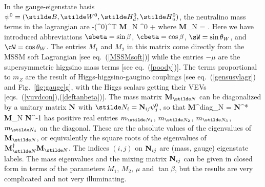In the gauge-eigenstate basis
$\psi^0 = (\stilde B, \stilde W^0, \stilde H_d^0, \stilde H_u^0)$,
the neutralino mass terms in the lagrangian are
\beq
\lagr \supset -\half (\psi^{0})^T {\bf M}_{\stilde N} \psi^0 + \conj
\eeq
where
\beq
{\bf M}_{\stilde N} = .
\label{neutralinomassmatrix}
\eeq
Here we have introduced abbreviations $\sbeta = \sin\beta$,
$\cbeta = \cos\beta$, $\sW = \sin\theta_W$, and $\cW = \cos\theta_W$.
The entries $M_1$ and $M_2$ in this matrix come directly from the MSSM
soft Lagrangian [see eq.~(\ref{MSSMsoft})] while the entries
$-\mu$ are the supersymmetric higgsino mass terms [see
eq.~(\ref{poody})]. The terms proportional
to $m_Z$ are the result of Higgs-higgsino-gaugino couplings
[see eq.~(\ref{gensusylagr}) and Fig.~\ref{fig:gauge}g], with the Higgs
scalars
getting
their VEVs [eqs.~(\ref{vuvdcon}),(\ref{deftanbeta})].
The mass matrix ${\bf M}_{\stilde N}$ can be diagonalized
by a unitary matrix ${\bf N}$ with
$\stilde N_i = {\bf N}_{ij} \psi^0_j$, so that
\beq
{\bf M}^{\rm diag}_{\stilde N} =
{\bf N}^* {\bf M}_{\stilde N} {\bf N}^{-1}
\label{diagmN}
\eeq
has positive real entries $m_{\stilde N_1}$, $m_{\stilde N_2}$,
$m_{\stilde N_3}$, $m_{\stilde N_4}$ on the diagonal.
These are the absolute values of the eigenvalues of ${\bf M}_{\stilde N}$,
or equivalently the square roots of the eigenvalues of
${\bf M}^\dagger_{\stilde N}{\bf M}_{\stilde N}$.
The indices $(i,j)$ on ${\bf N}_{ij}$ are (mass, gauge) eigenstate labels.
The mass eigenvalues and the mixing matrix ${\bf N}_{ij}$ can be given in
closed form in terms of the parameters $M_1$, $M_2$, $\mu$ and
$\tan\beta$, but the results are very complicated and not very
illuminating.

